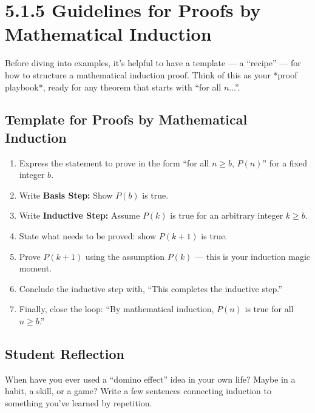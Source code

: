 \section*{5.1.5 Guidelines for Proofs by Mathematical Induction}

Before diving into examples, it’s helpful to have a template — a “recipe” — for how
to structure a mathematical induction proof. Think of this as your *proof
playbook*, ready for any theorem that starts with “for all $n$...”.

\subsection*{Template for Proofs by Mathematical Induction}

\begin{enumerate}
  \item Express the statement to prove in the form “for all $n \geq b$, $P(n)$” for a fixed integer $b$.
  \item Write \textbf{Basis Step:} Show $P(b)$ is true.
  \item Write \textbf{Inductive Step:} Assume $P(k)$ is true for an arbitrary integer $k \ge b$.
  \item State what needs to be proved: show $P(k+1)$ is true.
  \item Prove $P(k+1)$ using the assumption $P(k)$ — this is your induction magic moment.
  \item Conclude the inductive step with, “This completes the inductive step.”
  \item Finally, close the loop: “By mathematical induction, $P(n)$ is true for all $n \ge b$.”
\end{enumerate}

\begin{center}
\end{center}

\subsection*{Student Reflection}
When have you ever used a “domino effect” idea in your own life? Maybe in
a habit, a skill, or a game? Write a few sentences connecting induction to
something you’ve learned by repetition.

